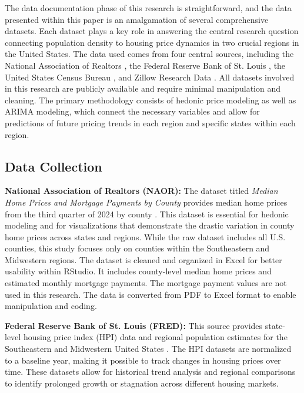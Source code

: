 \documentclass[journal,article,submit,pdftex,moreauthors]{Definitions/mdpi}
\begin{document}
The data documentation phase of this research is straightforward, and the data presented within this paper is an amalgamation of several comprehensive datasets. Each dataset plays a key role in answering the central research question connecting population density to housing price dynamics in two crucial regions in the United States. The data used comes from four central sources, including the National Association of Realtors \cite{_2024_county}, the Federal Reserve Bank of St. Louis \cite{a2024_hpi}, the United States Census Bureau \cite{_2024_state}, and Zillow Research Data \citep{zillow_2024_housing}. All datasets involved in this research are publicly available and require minimal manipulation and cleaning. The primary methodology consists of hedonic price modeling as well as ARIMA modeling, which connect the necessary variables and allow for predictions of future pricing trends in each region and specific states within each region.

\subsection{Data Collection}

\textbf{National Association of Realtors (NAOR):} The dataset titled \textit{Median Home Prices and Mortgage Payments by County} provides median home prices from the third quarter of 2024 by county \citep{_2024_county}. This dataset is essential for hedonic modeling and for visualizations that demonstrate the drastic variation in county home prices across states and regions. While the raw dataset includes all U.S. counties, this study focuses only on counties within the Southeastern and Midwestern regions. The dataset is cleaned and organized in Excel for better usability within RStudio. It includes county-level median home prices and estimated monthly mortgage payments. The mortgage payment values are not used in this research. The data is converted from PDF to Excel format to enable manipulation and coding.

\textbf{Federal Reserve Bank of St. Louis (FRED):} This source provides state-level housing price index (HPI) data and regional population estimates for the Southeastern and Midwestern United States \citep{a2024_hpi}. The HPI datasets are normalized to a baseline year, making it possible to track changes in housing prices over time. These datasets allow for historical trend analysis and regional comparisons to identify prolonged growth or stagnation across different housing markets.
\end{document}
